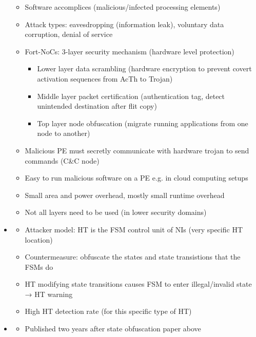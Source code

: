 \documentclass[
	paper=a4,
	fontsize=11pt,
	parskip=full %
]{scrreprt}
\begin{document}
\begin{itemize}
\begin{itemize}
                \item Software accomplices (malicious/infected processing elements)
                \item Attack types: eavesdropping (information leak), voluntary data corruption, denial of service
                \item Fort-NoCs: 3-layer security mechanism (hardware level protection)
                    \begin{itemize}
                        \item Lower layer data scrambling (hardware encryption to prevent covert activation sequences from AcTh to Trojan)
                        \item Middle layer packet certification (authentication tag, detect unintended destination after flit copy)
                        \item Top layer node obfuscation (migrate running applications from one node to another)
                    \end{itemize}
                \item Malicious PE must secretly communicate with hardware trojan to send commands (C\&C node)
                \item Easy to run malicious software on a PE e.g. in cloud computing setups
                \item Small area and power overhead, mostly small runtime overhead
                \item Not all layers need to be used (in lower security domains)
            \end{itemize}
        \item \textbf{}
            \begin{itemize}
                \item Attacker model: HT is the FSM control unit of NIs (very specific HT location)
                \item Countermeasure: obfuscate the states and state transistions that the FSMs do
                \item HT modifying state transitions causes FSM to enter illegal/invalid state → HT warning
                \item High HT detection rate (for this specific type of HT)
            \end{itemize}
        \item \textbf{}
            \begin{itemize}
                \item Published two years after state obfuscation paper above

\end{itemize}
\end{itemize}
\end{document}
